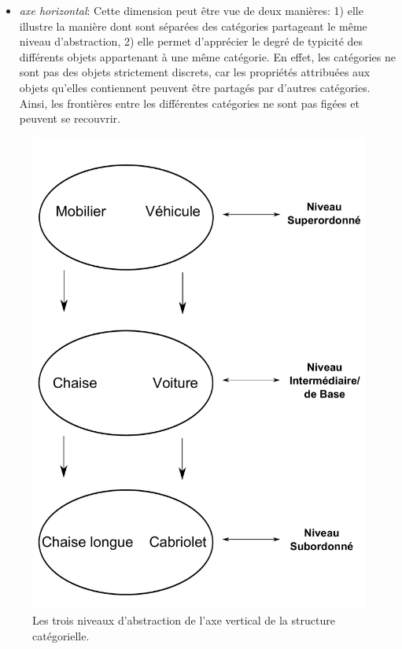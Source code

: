 \begin{itemize}
\item \textit{axe horizontal}: Cette dimension peut être vue de deux manières: 1) elle illustre la manière dont sont séparées des catégories partageant le même niveau d'abstraction, 2) elle permet d'apprécier le degré de typicité des différents objets appartenant à une même catégorie. En effet, les catégories ne sont pas des objets strictement discrets, car les propriétés attribuées aux objets qu'elles contiennent peuvent être partagés par d'autres catégories. Ainsi, les frontières entre les différentes catégories ne sont pas figées et peuvent se recouvrir. 
\end{itemize}

\begin{figure}[bth]
        \myfloatalign
        \includegraphics[width=.6\linewidth]{gfx/categorieLVL}
        \caption{Les trois niveaux d'abstraction de l'axe vertical de la structure catégorielle.}\label{fig:categorieLVL}
\end{figure}

